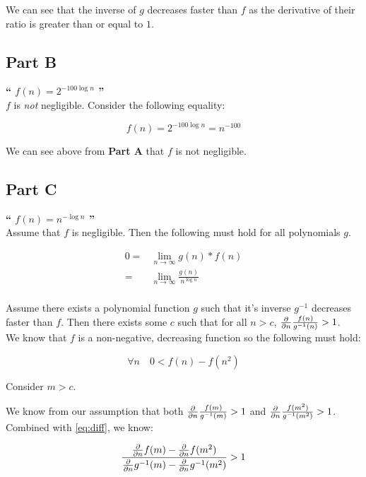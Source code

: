 \documentclass{article}
\newcommand{\HomeworkText}[1]{\textbf{``#1''}\\}
\begin{document}
	We can see that the inverse of $g$ decreases faster than $f$ as the derivative of their ratio is greater than or equal to $1$.

	\subsection*{Part B}
	\HomeworkText{
		$f(n) = 2^{-100 \log n}$
	}

	$f$ is \emph{not} negligible. Consider the following equality:
	
	$$ f(n) = 2^{-100 \log n} = n^{-100}$$
	
	We can see above from \textbf{Part A} that $f$ is not negligible.
	
	\subsection*{Part C}
	\HomeworkText{
		$f(n) = n^{-\log n}$
	}

	Assume that $f$ is negligible. Then the following must hold for all polynomials $g$.
	
	\begin{equation}
\begin{split}
	  0 = & \lim\limits_{n\rightarrow\infty} g(n)*f(n) \\
	    = & \lim\limits_{n\rightarrow\infty} \frac{g(n)}{n^{\log n}} \\
\end{split}
\end{equation}



	Assume there exists a polynomial function $g$ such that it's inverse $g^{-1}$ decreases faster than $f$. Then there exists some $c$ such that for all $n > c$, $\pdv{}{n} \frac{f(n)}{g^{-1}(n)} > 1$.\\

	We know that $f$ is a non-negative, decreasing function so the following must hold:

	\begin{equation}\label{eq:diff}
	  \forall n\quad 0 < f(n) - f(n^2)
	\end{equation}
	
	Consider $m > c$.
	
	We know from our assumption that both $\pdv{}{n} \frac{f(m)}{g^{-1}(m)} > 1$ and $\pdv{}{n} \frac{f(m^2)}{g^{-1}(m^2)} > 1$. Combined with \ref{eq:diff}, we know:

    \begin{equation}
	\frac{\pdv{}{n}f(m) - \pdv{}{n}f(m^2)}{\pdv{}{n}g^{-1}(m) - \pdv{}{n}g^{-1}(m^2)} > 1
	\end{equation}
	
\end{document}
